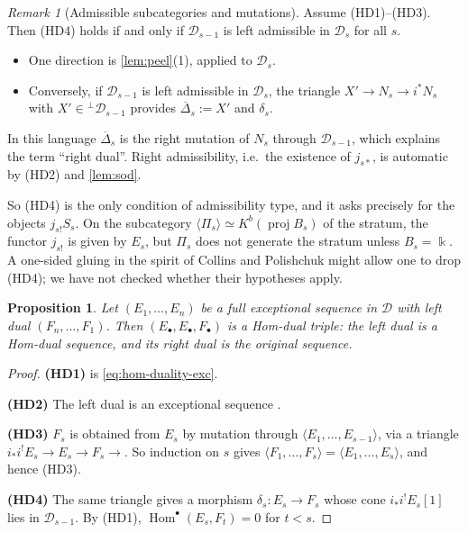 \documentclass[11pt,reqno]{amsart}
\theoremstyle{plain}
\newtheorem{proposition}[theorem]{Proposition}
\theoremstyle{definition}
\theoremstyle{remark}
\newtheorem{remark}[theorem]{Remark}
\newcommand{\kk}{\Bbbk}
\DeclareMathOperator{\Hom}{Hom}
\newcommand{\proj}{\operatorname{proj}}
\newcommand{\Kb}{K^b}
\newcommand{\thick}[1]{\langle #1\rangle}
\newcommand{\Deltabar}{\overline{\Delta}}
\newcommand{\cD}{\mathcal{D}}
\begin{document}
\begin{remark}[Admissible subcategories and mutations]\label{rem:HD4}
Assume (HD1)--(HD3). Then (HD4) holds if and only if $\cD_{s-1}$ is left admissible in $\cD_s$ for all $s$.
\begin{itemize}
\item One direction is \cref{lem:peel}(1), applied to $\cD_s$.
\item Conversely, if $\cD_{s-1}$ is left admissible in $\cD_s$, the triangle $X'\to N_s\to i^*N_s$ with $X'\in{}^\perp\cD_{s-1}$ provides $\Deltabar_s:=X'$ and $\delta_s$.
\end{itemize}
In this language $\Deltabar_s$ is the right mutation of $N_s$ through $\cD_{s-1}$, which explains the term ``right dual''. Right admissibility, i.e.\ the existence of $j_{s*}$, is automatic by (HD2) and \cref{lem:sod}.

So (HD4) is the only condition of admissibility type, and it asks precisely for the objects $j_{s!}S_s$. On the subcategory $\thick{\Pi_s}\simeq\Kb(\proj B_s)$ of the stratum, the functor $j_{s!}$ is given by $E_s$, but $\Pi_s$ does not generate the stratum unless $B_s=\kk$. A one-sided gluing in the spirit of Collins and Polishchuk \cite{CP10} might allow one to drop (HD4); we have not checked whether their hypotheses apply.
\end{remark}

\begin{proposition}\label{prop:exc-dual}
Let $(E_1,\dots,E_n)$ be a full exceptional sequence in $\cD$ with left dual $(F_n,\dots,F_1)$. Then $(E_\bullet,E_\bullet,F_\bullet)$ is a Hom-dual triple: the left dual is a Hom-dual sequence, and its right dual is the original sequence.
\end{proposition}

\begin{proof}
\textbf{(HD1)} is \eqref{eq:hom-duality-exc}.

\textbf{(HD2)} The left dual is an exceptional sequence \cite{Bon89}.

\textbf{(HD3)} $F_s$ is obtained from $E_s$ by mutation through $\thick{E_1,\dots,E_{s-1}}$, via a triangle $i_*i^!E_s\to E_s\to F_s\to$. So induction on $s$ gives $\thick{F_1,\dots,F_s}=\thick{E_1,\dots,E_s}$, and hence (HD3).

\textbf{(HD4)} The same triangle gives a morphism $\delta_s\colon E_s\to F_s$ whose cone $i_*i^!E_s[1]$ lies in $\cD_{s-1}$. By (HD1), $\Hom^\bullet(E_s,F_t)=0$ for $t<s$.
\end{proof}
\end{document}
